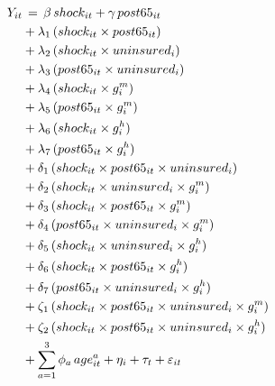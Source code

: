 		\begin{align*} \label{eq:reg3}
	Y_{it}& \thinspace  = \thinspace
	\beta \thinspace shock_{it} + \gamma \thinspace post65_{it} \\
	&+\lambda_1 \thinspace  (shock_{it} \times post65_{it}) \nonumber \\
	&+ \lambda_2 \thinspace (shock_{it} \times uninsured_i) \nonumber \\
	&+\lambda_3  \thinspace (post65_{it} \times uninsured_i) \nonumber \\
	&+ \lambda_4 \thinspace (shock_{it} \times g^m_i) \nonumber \\
	&+\lambda_5 \thinspace (post65_{it} \times g^m_i) \nonumber \\
	&+ \lambda_6 \thinspace (shock_{it} \times g^h_i) \nonumber \\
	&+\lambda_7 \thinspace (post65_{it} \times g^h_i) \nonumber \\
	&+ \delta_1 \thinspace (shock_{it} \times post65_{it} \times uninsured_i) \nonumber \\
	&+ \delta_2 \thinspace (shock_{it} \times uninsured_i \times g^m_i) \nonumber \\
	&+ \delta_3 \thinspace (shock_{it} \times post65_{it} \times g^m_i) \nonumber \\
	&+ \delta_4 \thinspace (post65_{it} \times uninsured_i \times g^m_i) \nonumber\\
	&+ \delta_5 \thinspace (shock_{it} \times uninsured_i \times g^h_i) \nonumber \\
	&+ \delta_6 \thinspace (shock_{it} \times post65_{it} \times g^h_i) \nonumber \\
	&+ \delta_7 \thinspace (post65_{it} \times uninsured_i \times g^h_i) \nonumber\\
	&+ \zeta_1 \thinspace (shock_{it} \times post65_{it} \times uninsured_i \times g^m_i) \nonumber \\
	&+ \zeta_2 \thinspace (shock_{it} \times post65_{it} \times uninsured_i \times g^h_i) \nonumber \\
	&+ \sum_{a=1}^3 \phi_a \thinspace age_{it}^{a} + \eta_i + \tau_t + \varepsilon_{it} \nonumber
	\end{align*}

